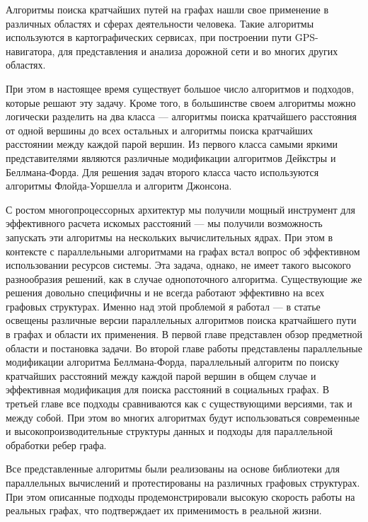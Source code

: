 \startprefacepage

Алгоритмы поиска кратчайших путей на графах нашли свое применение в различных областях и сферах деятельности человека. Такие алгоритмы используются в картографических сервисах, при построении пути GPS-навигатора, для представления и анализа дорожной сети и во многих других областях.
 
При этом в настоящее время существует большое число алгоритмов и подходов, которые решают эту задачу. Кроме того, в большинстве своем алгоритмы можно логически разделить на два класса --- алгоритмы поиска кратчайшего расстояния от одной вершины до всех остальных и алгоритмы поиска кратчайших расстоянии между каждой парой вершин. Из первого класса самыми яркими представителями являются различные модификации алгоритмов Дейкстры и Беллмана-Форда. Для решения задач второго класса часто используются алгоритмы Флойда-Уоршелла и алгоритм Джонсона. 

С ростом многопроцессорных архитектур мы получили мощный инструмент для эффективного расчета искомых расстояний --- мы получили возможность запускать эти алгоритмы на нескольких вычислительных ядрах. При этом в контексте с параллельными алгоритмами на графах встал вопрос об эффективном использовании ресурсов системы. Эта задача, однако, не имеет такого высокого разнообразия решений, как в случае однопоточного алгоритма. Существующие же решения довольно специфичны и не всегда работают эффективно на всех графовых структурах. Именно над этой проблемой я работал --- в статье освещены различные версии параллельных алгоритмов поиска кратчайшего пути в графах и области их применения. В первой главе представлен обзор предметной области и постановка задачи. Во второй главе работы представлены параллельные модификации алгоритма Беллмана-Форда, параллельный алгоритм по поиску кратчайших расстояний между каждой парой вершин в общем случае и эффективная модификация для поиска расстояний в социальных графах. В третьей главе все подходы сравниваются как с существующими версиями, так и между собой. При этом во многих алгоритмах будут использоваться современные и высокопроизводительные структуры данных и подходы для параллельной обработки ребер графа.

Все представленные алгоритмы были реализованы на основе библиотеки для параллельных вычислений и протестированы на различных графовых структурах. При этом описанные подходы продемонстрировали высокую скорость работы на реальных графах, что подтверждает их применимость в реальной жизни.
\FloatBarrier

